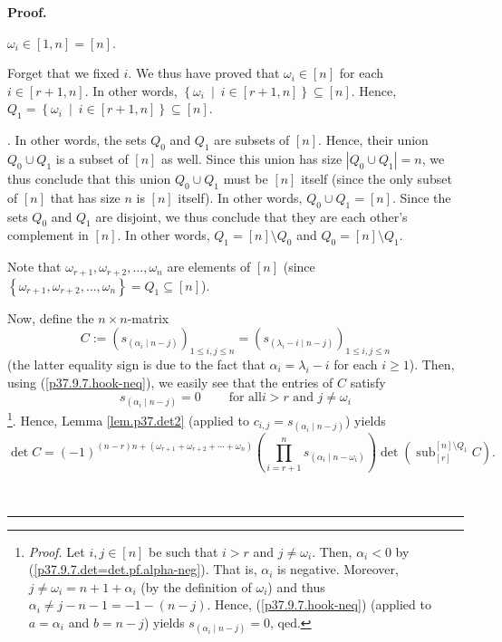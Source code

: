 \documentclass[numbers=enddot,12pt,final,onecolumn,notitlepage]{scrartcl}%
\theoremstyle{definition}
\newenvironment{proof}[1][Proof]{\noindent\textbf{#1.} }{\ \rule{0.5em}{0.5em}}
\let\prodnonlimits\prod
\renewcommand{\prod}{\prodnonlimits\limits}
\begin{document}
\begin{enumerate}
\begin{proof}
{$\omega_{i}\in\left[  1,n\right]  =\left[  n\right]  $.
\par
Forget that we fixed $i$. We thus have proved that $\omega_{i}\in\left[
n\right]  $ for each $i\in\left[  r+1,n\right]  $. In other words, $\left\{
\omega_{i}\ \mid\ i\in\left[  r+1,n\right]  \right\}  \subseteq\left[
n\right]  $. Hence, $Q_{1}=\left\{  \omega_{i}\ \mid\ i\in\left[
r+1,n\right]  \right\}  \subseteq\left[  n\right]  $.}. In other words, the
sets $Q_{0}$ and $Q_{1}$ are subsets of $\left[  n\right]  $. Hence, their
union $Q_{0}\cup Q_{1}$ is a subset of $\left[  n\right]  $ as well. Since
this union has size $\left\vert Q_{0}\cup Q_{1}\right\vert =n$, we thus
conclude that this union $Q_{0}\cup Q_{1}$ must be $\left[  n\right]  $ itself
(since the only subset of $\left[  n\right]  $ that has size $n$ is $\left[
n\right]  $ itself). In other words, $Q_{0}\cup Q_{1}=\left[  n\right]  $.
Since the sets $Q_{0}$ and $Q_{1}$ are disjoint, we thus conclude that they
are each other's complement in $\left[  n\right]  $. In other words,
$Q_{1}=\left[  n\right]  \setminus Q_{0}$ and $Q_{0}=\left[  n\right]
\setminus Q_{1}$.

Note that $\omega_{r+1},\omega_{r+2},\ldots,\omega_{n}$ are elements of
$\left[  n\right]  $ (since $\left\{  \omega_{r+1},\omega_{r+2},\ldots
,\omega_{n}\right\}  =Q_{1}\subseteq\left[  n\right]  $).

Now, define the $n\times n$-matrix%
\[
C:=\left(  s_{\left(  \alpha_{i}\mid n-j\right)  }\right)  _{1\leq i,j\leq
n}=\left(  s_{\left(  \lambda_{i}-i\mid n-j\right)  }\right)  _{1\leq i,j\leq
n}%
\]
(the latter equality sign is due to the fact that $\alpha_{i}=\lambda_{i}-i$
for each $i\geq1$). Then, using (\ref{p37.9.7.hook-neq}), we easily see that
the entries of $C$ satisfy%
\[
s_{\left(  \alpha_{i}\mid n-j\right)  }=0\ \ \ \ \ \ \ \ \ \ \text{for all
}i>r\text{ and }j\neq\omega_{i}%
\]
\footnote{\textit{Proof.} Let $i,j\in\left[  n\right]  $ be such that $i>r$
and $j\neq\omega_{i}$. Then, $\alpha_{i}<0$ by
(\ref{p37.9.7.det=det.pf.alpha-neg}). That is, $\alpha_{i}$ is negative.
Moreover, $j\neq\omega_{i}=n+1+\alpha_{i}$ (by the definition of $\omega_{i}$)
and thus $\alpha_{i}\neq j-n-1=-1-\left(  n-j\right)  $. Hence,
(\ref{p37.9.7.hook-neq}) (applied to $a=\alpha_{i}$ and $b=n-j$) yields
$s_{\left(  \alpha_{i}\mid n-j\right)  }=0$, qed.}. Hence, Lemma
\ref{lem.p37.det2} (applied to $c_{i,j}=s_{\left(  \alpha_{i}\mid n-j\right)
}$) yields
\begin{equation}
\det C=\left(  -1\right)  ^{\left(  n-r\right)  n+\left(  \omega_{r+1}%
+\omega_{r+2}+\cdots+\omega_{n}\right)  }\left(  \prod_{i=r+1}^{n}s_{\left(
\alpha_{i}\mid n-\omega_{i}\right)  }\right)  \det\left(  \operatorname*{sub}%
\nolimits_{\left[  r\right]  }^{\left[  n\right]  \setminus Q_{1}}C\right)  .
\label{p37.9.7.det=det.pf.4}%
\end{equation}



\end{proof}
\end{enumerate}
\end{document}
